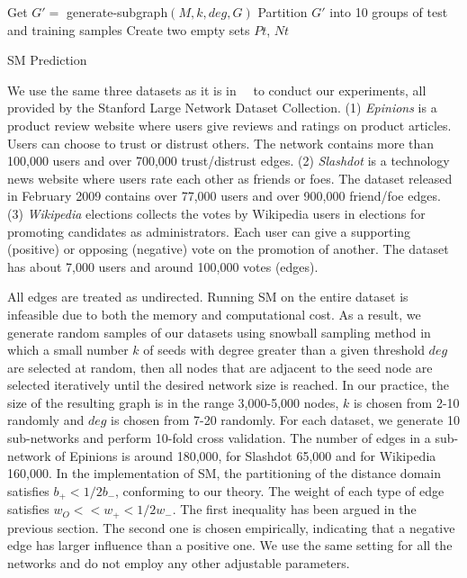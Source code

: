 \begin{algorithm}\label{alg}
 Get $G'=$ generate-subgraph$(M, k, deg, G)$\;
 Partition $G'$ into 10 groups of test and training samples\;
 Create two empty sets $Pt$, $Nt$\;
 \caption{SM Prediction}
\end{algorithm}

We use the same three datasets as it is
in~\cite{golbeck:distrust2011}~\cite{Leskovec:2010} to conduct our
experiments, all provided by the Stanford Large Network Dataset
Collection. (1) {\em Epinions} is a product review website where users
give reviews and ratings on product articles. Users can choose to
trust or distrust others. The network contains more than 100,000 users
and over 700,000 trust/distrust edges. (2) {\em Slashdot} is a
technology news website where users rate each other as friends or
foes. The dataset released in February 2009 contains over 77,000 users
and over 900,000 friend/foe edges. (3) {\em Wikipedia} elections
collects the votes by Wikipedia users in elections for promoting
candidates as administrators. Each user can give a supporting
(positive) or opposing (negative) vote on the promotion of
another. The dataset has about 7,000 users and around 100,000 votes
(edges).

All edges are treated as undirected. Running SM on the entire dataset
is infeasible due to both the memory and computational cost. As a
result, we generate random samples of our datasets using snowball
sampling method in which a small number $k$ of seeds with degree
greater than a given threshold $deg$ are selected at random, then all
nodes that are adjacent to the seed node are selected iteratively
until the desired network size is reached.  In our practice, the size
of the resulting graph is in the range 3,000-5,000 nodes, $k$ is
chosen from 2-10 randomly and $deg$ is chosen from 7-20 randomly. For
each dataset, we generate 10 sub-networks and perform 10-fold cross
validation. The number of edges in a sub-network of Epinions is around
180,000, for Slashdot 65,000 and for Wikipedia 160,000. In the
implementation of SM, the partitioning of the distance domain
satisfies $b_{+} < 1/2b_{-}$, conforming to our theory. The weight of
each type of edge satisfies $w_{O}<<w_{+}<1/2w_{-}$. The first
inequality has been argued in the previous section. The second one is
chosen empirically, indicating that a negative edge has larger
influence than a positive one. We use the same setting for all the
networks and do not employ any other adjustable parameters.


